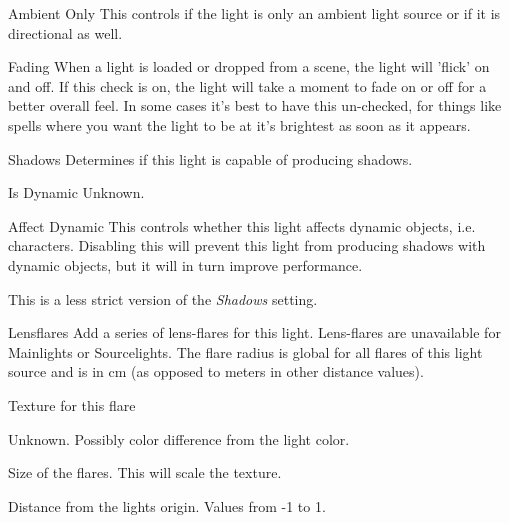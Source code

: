 \begin{propertyAurora}{Ambient Only}
This controls if the light is only an ambient light source or
if it is directional as well.
\end{propertyAurora}

\begin{propertyAurora}{Fading}
When a light is loaded or dropped from a scene, the light will 'flick' on and off. 
If this check is on, the light will take a moment to fade on or off for a better overall feel.
In some cases it’s best to have this un-checked, for things like spells where you want 
the light to be at it’s brightest as soon as it appears.
\end{propertyAurora}

\begin{propertyAurora}{Shadows}
Determines if this light is capable of producing shadows.
\end{propertyAurora}

\begin{propertyAurora}{Is Dynamic}
Unknown.
\end{propertyAurora}

\begin{propertyAurora}{Affect Dynamic}
This controls whether this light affects dynamic objects, i.e. characters.
Disabling this will prevent this light from producing shadows with dynamic
objects, but it will in turn improve performance.

This is a less strict version of the \textit{Shadows} setting.
\end{propertyAurora}

\begin{propertyAurora}{Lensflares}
Add a series of lens-flares for this light. Lens-flares are unavailable for 
Mainlights or Sourcelights. The flare radius is global for all flares of 
this light source and is in cm (as opposed to meters in other distance values).
\begin{description}[leftmargin=6em,style=nextline]
    \item[Texture] Texture for this flare
    \item[Colorshift] Unknown. Possibly color difference from the light color.
    \item[Size] Size of the flares. This will scale the texture.
    \item[Position] Distance from the lights origin. Values from -1 to 1.
\end{description}
\end{propertyAurora}

